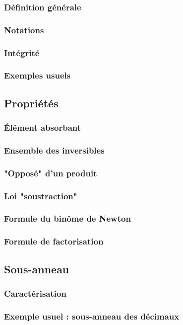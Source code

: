 \documentclass[12pt,a4paper,french]{book}
\begin{document}
\begin{spacing}{1.0}
			\subsubsection{Définition générale}
			\subsubsection{Notations}
			\subsubsection{Intégrité}
			\subsubsection{Exemples usuels}
		\subsection{Propriétés}
			\subsubsection{Élément absorbant}
			\subsubsection{Ensemble des inversibles}
			\subsubsection{"Opposé" d'un produit}
			\subsubsection{Loi "soustraction"}
			\subsubsection{Formule du binôme de Newton}
			\subsubsection{Formule de factorisation}
		\subsection{Sous-anneau}
			\subsubsection{Caractérisation}
			\subsubsection{Exemple usuel : sous-anneau des décimaux}

\end{spacing}
\end{document}
